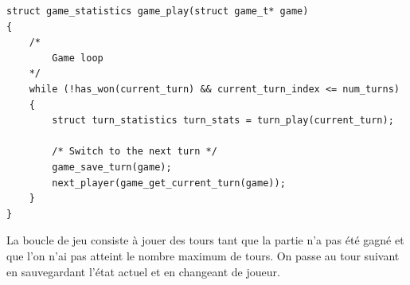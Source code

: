 \begin{lstlisting}[frame=single, caption={Implémentation de la boucle de jeu}]
struct game_statistics game_play(struct game_t* game)
{
    /*
        Game loop
    */
    while (!has_won(current_turn) && current_turn_index <= num_turns)
    {
        struct turn_statistics turn_stats = turn_play(current_turn);
    
        /* Switch to the next turn */
        game_save_turn(game);
        next_player(game_get_current_turn(game));
    }
}
\end{lstlisting}

La boucle de jeu consiste à jouer des tours tant que la partie n'a pas été gagné et que l'on n'ai pas atteint le nombre maximum de tours. On passe au tour suivant en sauvegardant l'état actuel et en changeant de joueur.